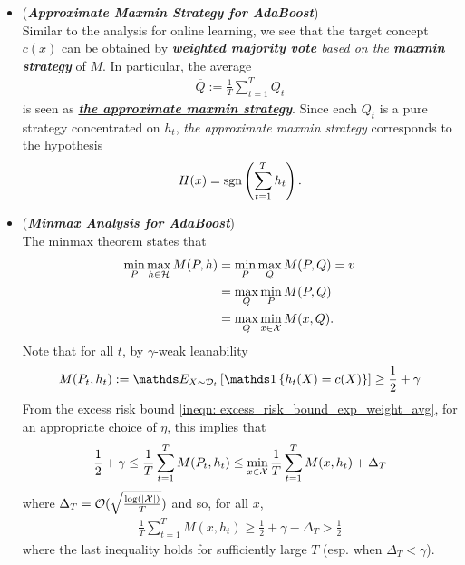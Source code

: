 \documentclass[11pt]{article}
\begin{document}
\begin{itemize}
\item \begin{remark}(\textbf{\emph{Approximate Maxmin Strategy for AdaBoost}})\\
 Similar to the analysis for online learning, we see that the target concept $c(x)$ can be obtained by \emph{\textbf{weighted majority vote} based on the \textbf{maxmin strategy}} of $M$. In particular, the average
\begin{align*}
\overline{Q} := \frac{1}{T}\sum_{t=1}^{T}Q_t
\end{align*} is seen as \underline{\emph{\textbf{the approximate maxmin strategy}}}. Since each $Q_t$ is a pure strategy concentrated on $h_t$, \emph{the approximate maxmin strategy} corresponds to the hypothesis
\begin{align*}
H(x) = \text{sgn}\left(\sum_{t=1}^{T}h_t\right).
\end{align*}
\end{remark}

\item \begin{remark}(\textbf{\emph{Minmax Analysis for AdaBoost}}) \citep{schapire2012boosting}\\
The minmax theorem states that
\begin{align}
\min_{P}\max_{h \in {\mathcal H}}M(P, h) &= \min_{P}\max_{Q}M(P, Q) = v \nonumber\\
&= \max_{Q}\min_{P}M(P, Q) \nonumber\\
&= \max_{Q}\min_{x \in {\mathcal X}}M(x, Q). \label{eqn: minmax_boost}
\end{align} Note that for all $t$, by $\gamma$-weak leanability
\begin{align*}
M(P_t, h_t) := \E{X\sim\cD_t}{\ind{h_t(X) = c(X)}} \ge \frac{1}{2} + \gamma
\end{align*} From the excess risk bound \eqref{ineqn: excess_risk_bound_exp_weight_avg}, for an appropriate choice of $\eta$, this implies that
\begin{align}
 \frac{1}{2} + \gamma \le \frac{1}{T}\sum_{t=1}^{T}M(P_t, h_t)  \le \min_{x \in {\mathcal X}}\frac{1}{T}\sum_{t=1}^{T}M(x, h_t) + \Delta_T  \label{ineqn: excess_risk_bound_adaboost}
\end{align} where $\Delta_T = {\mathcal O}(\sqrt{\frac{\log (\left\lvert {\mathcal X} \right\rvert)}{T}})$ and so, for all $x$,
\begin{align}
\frac{1}{T}\sum_{t=1}^{T}M(x, h_t)  \ge  \frac{1}{2} + \gamma - \Delta_T > \frac{1}{2} \label{ineqn: excess_risk_bound_adaboost2}
\end{align} where the last inequality holds for sufficiently large $T$ (esp. when $\Delta_T < \gamma$). 


\end{remark}
\end{itemize}
\end{document}
